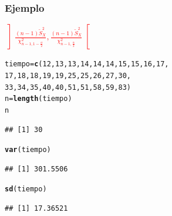 \documentclass[12pt,t]{beamer}\usepackage[]{graphicx}\usepackage[]{color}
\makeatletter
\newcommand{\hlnum}[1]{\textcolor[rgb]{0.686,0.059,0.569}{#1}}%
\newcommand{\hlstd}[1]{\textcolor[rgb]{0.345,0.345,0.345}{#1}}%
\newcommand{\hlkwb}[1]{\textcolor[rgb]{0.69,0.353,0.396}{#1}}%
\newcommand{\hlkwd}[1]{\textcolor[rgb]{0.737,0.353,0.396}{\textbf{#1}}}%
\newenvironment{kframe}{%
 \def\at@end@of@kframe{}%
 \ifinner\ifhmode%
  \def\at@end@of@kframe{\end{minipage}}%
  \begin{minipage}{\columnwidth}%
 \fi\fi%
 \def\FrameCommand##1{\hskip\@totalleftmargin \hskip-\fboxsep
 \colorbox{shadecolor}{##1}\hskip-\fboxsep
     \hskip-\linewidth \hskip-\@totalleftmargin \hskip\columnwidth}%
 \MakeFramed {\advance\hsize-\width
   \@totalleftmargin\z@ \linewidth\hsize
   \@setminipage}}%
 {\par\unskip\endMakeFramed%
 \at@end@of@kframe}
\newenvironment{knitrout}{}{} %
\newcommand{\red}[1]{\textcolor{red}{#1}}
\theoremstyle{plain}
\theoremstyle{definition}
\makeatother
\begin{document}
\begin{frame}[fragile]
\frametitle{Ejemplo}
\red{$\displaystyle \left] \frac{(n-1)\widetilde{S}_{X}^2}{\chi_{n-1,1-\frac{\alpha}{2}}^2},
\frac{(n-1)\widetilde{S}_{X}^2}{\chi_{n-1,\frac{\alpha}{2}}^2}
\right[$}
\begin{knitrout}\footnotesize
{}\color{fgcolor}\begin{kframe}
\begin{alltt}
\hlstd{tiempo}\hlkwb{=}\hlkwd{c}\hlstd{(}\hlnum{12}\hlstd{,} \hlnum{13}\hlstd{,} \hlnum{13}\hlstd{,} \hlnum{14}\hlstd{,} \hlnum{14}\hlstd{,} \hlnum{14}\hlstd{,} \hlnum{15}\hlstd{,} \hlnum{15}\hlstd{,} \hlnum{16}\hlstd{,} \hlnum{17}\hlstd{,}
         \hlnum{17}\hlstd{,} \hlnum{18}\hlstd{,} \hlnum{18}\hlstd{,} \hlnum{19}\hlstd{,} \hlnum{19}\hlstd{,} \hlnum{25}\hlstd{,} \hlnum{25}\hlstd{,} \hlnum{26}\hlstd{,} \hlnum{27}\hlstd{,} \hlnum{30}\hlstd{,}
         \hlnum{33}\hlstd{,} \hlnum{34}\hlstd{,} \hlnum{35}\hlstd{,} \hlnum{40}\hlstd{,} \hlnum{40}\hlstd{,} \hlnum{51}\hlstd{,} \hlnum{51}\hlstd{,} \hlnum{58}\hlstd{,} \hlnum{59}\hlstd{,} \hlnum{83}\hlstd{)}
\hlstd{n}\hlkwb{=}\hlkwd{length}\hlstd{(tiempo)}
\hlstd{n}
\end{alltt}
\begin{verbatim}
## [1] 30
\end{verbatim}
\begin{alltt}
\hlkwd{var}\hlstd{(tiempo)}
\end{alltt}
\begin{verbatim}
## [1] 301.5506
\end{verbatim}
\begin{alltt}
\hlkwd{sd}\hlstd{(tiempo)}
\end{alltt}
\begin{verbatim}
## [1] 17.36521
\end{verbatim}
\end{kframe}
\end{knitrout}
\end{frame}
 
\end{document}
